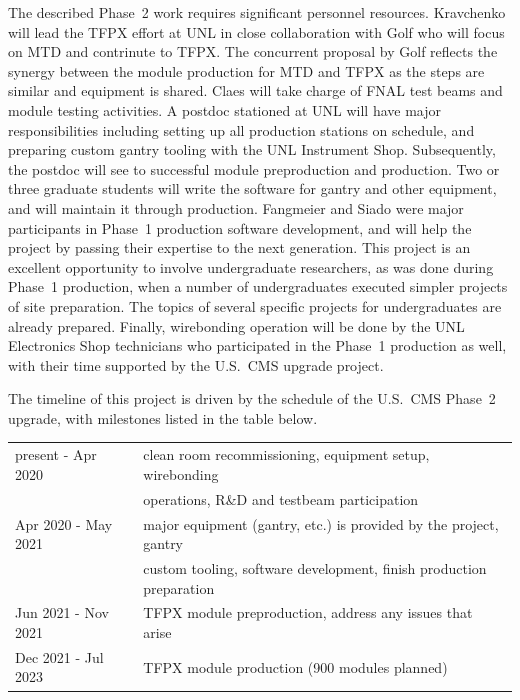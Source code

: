 The described Phase~2 work requires significant personnel resources. Kravchenko will lead the TFPX effort at UNL in close collaboration with Golf who will focus on MTD and contrinute to TFPX. The concurrent proposal by Golf reflects the synergy between the module production for MTD and TFPX as the steps are similar and equipment is shared. Claes will take charge of FNAL test beams and module testing activities. A postdoc stationed at UNL will have major responsibilities including setting up all production stations on schedule, and preparing custom gantry tooling with the UNL Instrument Shop.
Subsequently, the postdoc will see to successful module preproduction and production. Two or three graduate students will write the software for gantry and other equipment, and will maintain it through production. Fangmeier and Siado were major participants in  Phase~1 production software development, and will help the project by passing their expertise to the next generation. This project is an excellent opportunity to involve undergraduate researchers, as was done during Phase~1 production, when a number of undergraduates executed simpler projects of site preparation. The topics of several specific projects for undergraduates are already prepared.
Finally,  wirebonding operation will be done by the UNL Electronics Shop technicians who participated in the Phase~1 production as well, with their time supported by the U.S.~CMS upgrade project.

The timeline of this project is driven by the schedule of the U.S.~CMS Phase~2 upgrade, with milestones listed in the table below.

\vspace{3mm}
\noindent
\begin{tabular}{l|l}
\hline
present - Apr 2020 & clean room recommissioning, equipment setup, wirebonding \\
        &  operations, R\&D and testbeam participation \\
Apr 2020 - May 2021 
         & major equipment (gantry, etc.) is provided by the project, gantry \\
         & custom tooling, software development, finish production preparation \\
Jun 2021 - Nov 2021
         & TFPX module preproduction, address any issues that arise \\
Dec 2021 - Jul 2023 
         &  TFPX module production (900 modules planned) \\
\hline
\end{tabular}

